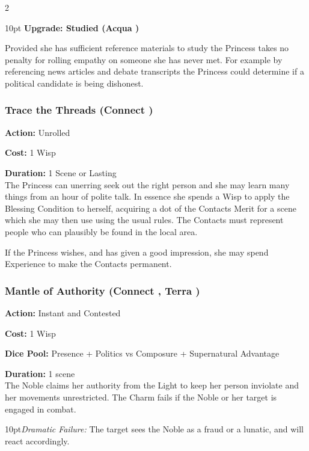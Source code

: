 \begin{multicols}{2}
\begin{myindentpar}{10pt}
	\textbf{Upgrade: Studied (Acqua \textbullet)}

	Provided she has sufficient reference materials to study the Princess takes no penalty for rolling empathy on someone she has never met. For example by referencing news articles and debate transcripts the Princess could determine if a political candidate is being dishonest.  

	\end{myindentpar}

\subsubsection*{Trace the Threads (Connect \textbullet)}

\noindent \textbf{Action:} Unrolled

\noindent \textbf{Cost:} 1 Wisp

\noindent \textbf{Duration:} 1 Scene or Lasting \\

\noindent The Princess can unerring seek out the right person and she may learn many things from an hour of polite talk. In essence she spends a Wisp to apply the Blessing Condition to herself, acquiring a dot of the Contacts Merit for a scene which she may then use using the usual rules. The Contacts must represent people who can plausibly be found in the local area.

If the Princess wishes, and has given a good impression, she may spend Experience to make the Contacts permanent.

\subsubsection*{Mantle of Authority (Connect \textbullet, Terra \textbullet)}

\noindent \textbf{Action:} Instant and Contested

\noindent \textbf{Cost:} 1 Wisp

\noindent \textbf{Dice Pool:} Presence + Politics vs Composure + Supernatural Advantage

\noindent \textbf{Duration:} 1 scene \\

\noindent The Noble claims her authority from the Light to keep her person inviolate and her movements unrestricted. The Charm fails if the Noble or her target is engaged in combat.

    \begin{myindentpar}{10pt}\emph{Dramatic Failure:} The target sees the Noble as a fraud or a lunatic, and will react accordingly.


\end{myindentpar}
\end{multicols}
